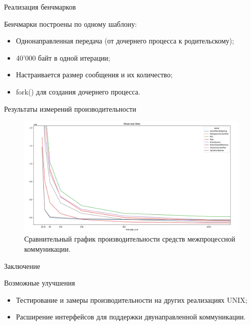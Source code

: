 \documentclass{beamer}
\begin{document}
\begin{frame}{Реализация бенчмарков}

  \begin{alertblock}{Бенчмарки построены по одному шаблону:}
  \begin{itemize}
    \item Однонаправленная передача (от дочернего процесса к родительскому);
    \item 40'000 байт в одной итерации;
	\item Настраивается размер сообщения и их количество;
	\item fork() для создания дочернего процесса.
  \end{itemize}
  \end{alertblock}

\end{frame}

\begin{frame}{Результаты измерений производительности}

\begin{figure}[H]
  \centering
  \begin{minipage}[t]{\textwidth}
    \centering
    \includegraphics[width=\textwidth]{./imgs/performance.png}
  \end{minipage}
  \caption{Сравнительный график производительности средств межпроцессной
    коммуникации.}
  \label{fig:performance}
\end{figure}

\end{frame}

\begin{frame}{Заключение}
  \begin{alertblock}{Возможные улучшения}
  \begin{itemize}
    \item Тестирование и замеры производительности на других реализациях UNIX;
    \item Расширение интерфейсов для поддержки двунаправленной коммуникации.
  \end{itemize}
  \end{alertblock}
\end{frame}
\end{document}
